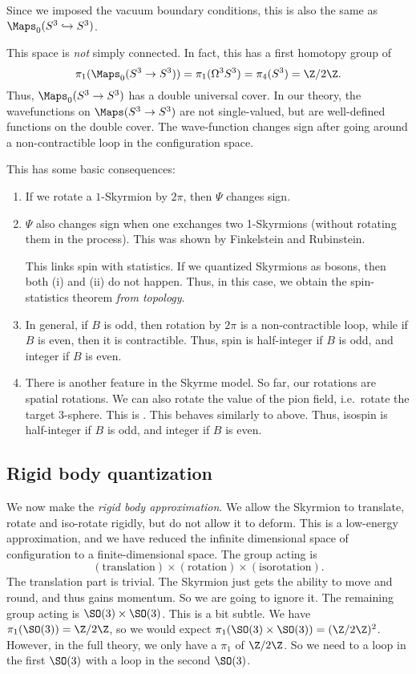 \documentclass[a4paper]{article}
\begin{document}
Since we imposed the vacuum boundary conditions, this is also the same as $\Maps_0(S^3 \hookrightarrow S^3)$.

This space is \emph{not} simply connected. In fact, this has a first homotopy group of
\[
  \pi_1(\Maps_0(S^3 \to S^3)) = \pi_1(\Omega^3 S^3) = \pi_4(S^3) = \Z/2\Z.
\]
Thus, $\Maps_0(S^3 \to S^3)$ has a double universal cover. In our theory, the wavefunctions on $\Maps(S^3 \to S^3)$ are not single-valued, but are well-defined functions on the double cover. The wave-function changes sign after going around a non-contractible loop in the configuration space.

This has some basic consequences:
\begin{enumerate}
  \item If we rotate a $1$-Skyrmion by $2\pi$, then $\Psi$ changes sign.

  \item $\Psi$ also changes sign when one exchanges two 1-Skyrmions (without rotating them in the process). This was shown by Finkelstein and Rubinstein.

    This links spin with statistics. If we quantized Skyrmions as bosons, then both (i) and (ii) do not happen. Thus, in this case, we obtain the spin-statistics theorem \emph{from topology}.
  \item In general, if $B$ is odd, then rotation by $2\pi$ is a non-contractible loop, while if $B$ is even, then it is contractible. Thus, spin is half-integer if $B$ is odd, and integer if $B$ is even.

  \item There is another feature in the Skyrme model. So far, our rotations are spatial rotations. We can also rotate the value of the pion field, i.e.\ rotate the target $3$-sphere. This is . This behaves similarly to above. Thus, isospin is half-integer if $B$ is odd, and integer if $B$ is even.
\end{enumerate}

\subsection{Rigid body quantization}
We now make the \emph{rigid body approximation}. We allow the Skyrmion to translate, rotate and iso-rotate rigidly, but do not allow it to deform. This is a low-energy approximation, and we have reduced the infinite dimensional space of configuration to a finite-dimensional space. The group acting is
\[
  (\mathrm{translation}) \times (\mathrm{rotation}) \times (\mathrm{isorotation}).
\]
The translation part is trivial. The Skyrmion just gets the ability to move and round, and thus gains momentum. So we are going to ignore it. The remaining group acting is $\SO(3) \times \SO(3)$. This is a bit subtle. We have $\pi_1(\SO(3)) = \Z/2\Z$, so we would expect $\pi_1(\SO(3) \times \SO(3)) = (\Z/2\Z)^2$. However, in the full theory, we only have a $\pi_1$ of $\Z/2\Z$. So we need to a loop in the first $\SO(3)$ with a loop in the second $\SO(3)$.
\end{document}
